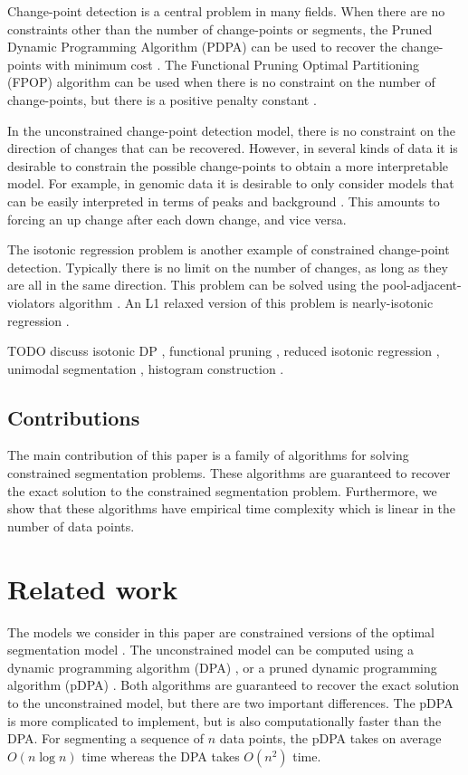 \documentclass{article}
\begin{document}
Change-point detection is a central problem in many fields. When there
are no constraints other than the number of change-points or segments,
the Pruned Dynamic Programming Algorithm (PDPA) can be used to recover
the change-points with minimum cost \citep{pruned-dp}. The Functional
Pruning Optimal Partitioning (FPOP) algorithm can be used when there
is no constraint on the number of change-points, but there is a
positive penalty constant \citep{FPOP}. 

In the unconstrained change-point detection model, there is no
constraint on the direction of changes that can be recovered. However,
in several kinds of data it is desirable to constrain the possible
change-points to obtain a more interpretable model. For example, in
genomic data it is desirable to only consider models that can be
easily interpreted in terms of peaks and background
\citep{PeakSeg}. This amounts to forcing an up change after each down
change, and vice versa.

The isotonic regression problem is another example of constrained
change-point detection. Typically there is no limit on the number of
changes, as long as they are all in the same direction. This problem
can be solved using the pool-adjacent-violators algorithm
\citep{mair2009isotone}. An L1 relaxed version of this problem is
nearly-isotonic regression \citep{tibshirani2011nearly}.

TODO discuss isotonic DP \citep{isotonic-dp}, functional pruning
\citep{phd-johnson}, reduced isotonic regression
\citep{hardwick2014optimal}, unimodal segmentation
\citep{haiminen2008algorithms}, histogram construction
\citep{halim2009fast}.

\subsection{Contributions}

The main contribution of this paper is a family of algorithms for
solving constrained segmentation problems. These algorithms are
guaranteed to recover the exact solution to the constrained
segmentation problem. Furthermore, we show that these algorithms have
empirical time complexity which is linear in the number of data
points.

\section{Related work}
\label{sec:related}

The models we consider in this paper are constrained versions of the
optimal segmentation model \citep{Segmentor}. The
unconstrained model can be computed using a dynamic programming
algorithm (DPA) \citep{bellman}, or a pruned dynamic programming
algorithm (pDPA) \citep{pruned-dp}. Both algorithms are guaranteed to
recover the exact solution to the unconstrained model, but there are
two important differences. The pDPA is more complicated to implement,
but is also computationally faster than the DPA. For segmenting a
sequence of $n$ data points, the pDPA takes on average $O(n\log n)$
time whereas the DPA takes $O(n^2)$ time.
\end{document}
